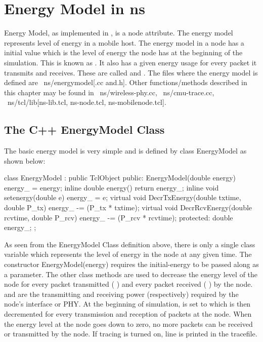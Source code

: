 \chapter{Energy Model in ns}
\label{chap:enerymodel}

Energy Model, as implemented in \ns, is a node attribute. The
energy model represents level of energy in a mobile host. The energy
model in a node has a initial value which is the level of energy the node
has at the beginning of the simulation. This is known as
.
It also has a given energy usage
for every packet it transmits and receives. These are called
 and .
The files where the energy model is defined are ~ns/energymodel[.cc and.h].
Other functions/methods described in this chapter may be found in
~ns/wireless-phy.cc, ~ns/cmu-trace.cc, ~ns/tcl/lib[ns-lib.tcl, 
ns-node.tcl, ns-mobilenode.tcl].


\section{The C++ EnergyModel Class}
\label{sec:c++energymodel}

The basic energy model is very simple and is defined by class EnergyModel
as shown below:

\begin{program}
class EnergyModel : public TclObject {
public:
  EnergyModel(double energy) { energy_ = energy; }
  inline double energy() { return energy_; }
  inline void setenergy(double e) {energy_ = e;}
  virtual void DecrTxEnergy(double txtime, double P_tx) {
    energy_ -= (P_tx * txtime);
  }
  virtual void DecrRcvEnergy(double rcvtime, double P_rcv) {
    energy_ -= (P_rcv * rcvtime);
  }
protected:
  double energy_;
};   
\end{program}

As seen from the EnergyModel Class definition above, there is only a
single class variable  which represents the
level of energy in the node at any given time. The constructor
EnergyModel(energy) requires the initial-energy to be passed along as a 
parameter. The other class methods are
used to decrease the energy level of the node for every packet transmitted
( ) and every packet received (
) by the node.  and  are the
transmitting and
receiving power (respectively) required by the node's interface or PHY.
At the beginning of simulation,  is set to
 which is then
decremented for every transmission and reception of packets at the node.
When the energy level at the node goes down to zero, no more packets can
be received or transmitted by the node. If tracing is turned on, line
is printed in the tracefile.


